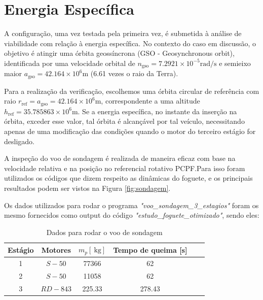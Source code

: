 \section{Energia Específica}

A configuração, uma vez testada pela primeira vez, é submetida à análise de viabilidade com relação à energia específica. No contexto do caso em discussão, o objetivo é atingir uma órbita geossíncrona (GSO - Geosynchronous orbit), identificada por uma velocidade orbital de $n_{\text{gso}} = 7.2921 \times 10^{-5} \text{rad/s}$ e semieixo maior $a_{\text{gso}}= 42.164 \times 10^{6} \text{m}$ (6.61 vezes o raio da Terra).

Para a realização da verificação, escolhemos uma órbita circular de referência com raio $r_{\text{ref}} = a_{\text{gso}} = 42.164 \times 10^{6} \text{m}$, correspondente a uma altitude $h_{\text{ref}} = 35.785863 \times 10^{6} \text{m}$. Se a energia específica, no instante da inserção na órbita, exceder esse valor, tal órbita é alcançável por tal veículo, necessitando apenas de uma modificação das condições quando o motor do terceiro estágio for desligado.

A inspeção do voo de sondagem é realizada de maneira eficaz com base na velocidade relativa e na posição no referencial rotativo PCPF.Para isso foram utilizados os códigos que dizem respeito as dinâmicas do foguete, e os principais resultados podem ser vistos na Figura \ref{fig:sondagem}. 

Os dados utilizados para rodar o programa \textit{"voo\_sondagem\_3\_estagios"} foram os mesmo fornecidos como output do código \textit{"estudo\_foguete\_otimizado"}, sendo eles:

\begin{table}[h]
\centering
\caption{Dados para rodar o voo de sondagem} 
\label{tab:final}
\begin{tabular}{cccccc}
\hline
Estágio & Motores & $m_{p}[\mathrm{~kg}]$ & Tempo de queima [s]\\
\hline
1 & $S-50$ & 77366 &  62 \\
2 & $S-50$ & 11058 & 62 \\
3 & $R D-843$ & 225.33 & 278.43 \\
\hline
\end{tabular}

\end{table}

